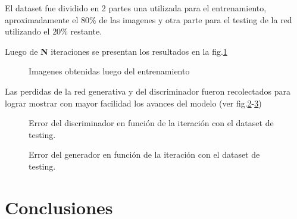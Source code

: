 \documentclass[]{IEEEtran}
\begin{document}
    El dataset fue dividido en 2 partes una utilizada para el entrenamiento, aproximadamente el $80 \% $ de las imagenes y 
    otra parte para el testing de la red utilizando el $20 \%$ restante.

    Luego de \textbf{N} iteraciones se presentan los resultados en la fig.\ref{fig:resultados}

    \begin{figure}[htb]
        \centering
        \caption{Imagenes obtenidas luego del entrenamiento}
        \label{fig:resultados}
    \end{figure}

    Las perdidas de la red generativa y del discriminador fueron recolectados para 
    lograr mostrar con mayor facilidad los avances del modelo (ver fig.\ref{fig:error-discriminador}-\ref{fig:error-generador})

    \begin{figure}[htb]
        \centering
        
        \caption{Error del discriminador en función de la iteración con el dataset de testing.}
        \label{fig:error-discriminador}
    \end{figure}

    \begin{figure}[htb]
        \centering
        
        \caption{Error del generador en función de la iteración con el dataset de testing.}
        \label{fig:error-generador}
    \end{figure}

    \section{Conclusiones}

    
    
\end{document}
